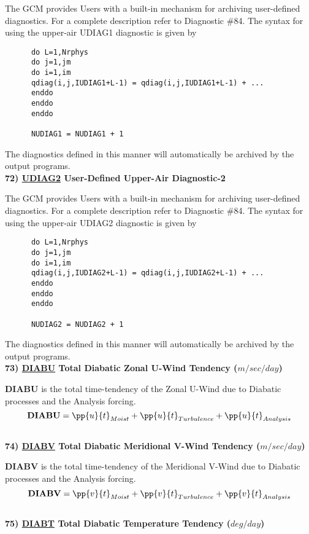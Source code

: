 \noindent
The GCM provides Users with a built-in mechanism for archiving user-defined
diagnostics.  For a complete description refer to Diagnostic \#84.
The syntax for using the upper-air UDIAG1 diagnostic is given by
\begin{verbatim}
      do L=1,Nrphys
      do j=1,jm
      do i=1,im
      qdiag(i,j,IUDIAG1+L-1) = qdiag(i,j,IUDIAG1+L-1) + ...
      enddo
      enddo
      enddo

      NUDIAG1 = NUDIAG1 + 1
\end{verbatim}
The diagnostics defined in this manner will automatically be archived by the 
output programs.
\\

\noindent
{\bf 72)  \underline {UDIAG2} User-Defined Upper-Air Diagnostic-2 }

\noindent
The GCM provides Users with a built-in mechanism for archiving user-defined
diagnostics.  For a complete description refer to Diagnostic \#84.
The syntax for using the upper-air UDIAG2 diagnostic is given by
\begin{verbatim}
      do L=1,Nrphys
      do j=1,jm
      do i=1,im
      qdiag(i,j,IUDIAG2+L-1) = qdiag(i,j,IUDIAG2+L-1) + ...
      enddo
      enddo
      enddo

      NUDIAG2 = NUDIAG2 + 1
\end{verbatim}
The diagnostics defined in this manner will automatically be archived by the 
output programs.
\\


\noindent
{\bf 73)  \underline {DIABU} Total Diabatic Zonal U-Wind Tendency  ($m/sec/day$) }

\noindent
{\bf DIABU} is the total time-tendency of the Zonal U-Wind due to Diabatic processes
and the Analysis forcing.
\[
{\bf DIABU} = \pp{u}{t}_{Moist} + \pp{u}{t}_{Turbulence} + \pp{u}{t}_{Analysis} 
\]
\\

\noindent
{\bf 74)  \underline {DIABV} Total Diabatic Meridional V-Wind Tendency  ($m/sec/day$) }

\noindent
{\bf DIABV} is the total time-tendency of the Meridional V-Wind due to Diabatic processes
and the Analysis forcing.
\[
{\bf DIABV} = \pp{v}{t}_{Moist} + \pp{v}{t}_{Turbulence} + \pp{v}{t}_{Analysis} 
\]
\\

\noindent
{\bf 75)  \underline {DIABT} Total Diabatic Temperature Tendency  ($deg/day$) }


